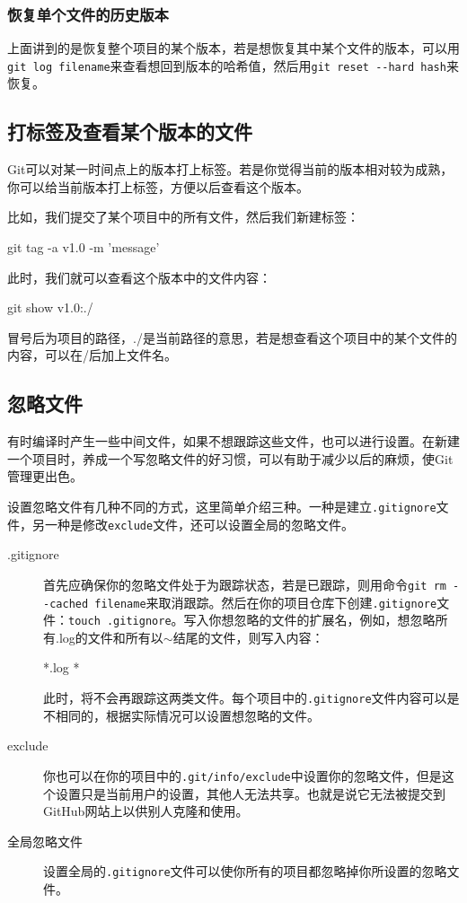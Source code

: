\documentclass[a4paper,12pt]{article}
\begin{document}
\subsubsection{恢复单个文件的历史版本}

上面讲到的是恢复整个项目的某个版本，若是想恢复其中某个文件的版本，可以用\lstinline|git log filename|来查看想回到版本的哈希值，然后用\lstinline|git reset --hard hash|来恢复。

\subsection{打标签及查看某个版本的文件}
Git可以对某一时间点上的版本打上标签。若是你觉得当前的版本相对较为成熟，你可以给当前版本打上标签，方便以后查看这个版本。

比如，我们提交了某个项目中的所有文件，然后我们新建标签：
\begin{bash}
git tag -a v1.0 -m 'message'
\end{bash}
此时，我们就可以查看这个版本中的文件内容：
\begin{bash}
git show v1.0:./
\end{bash}
冒号后为项目的路径，./是当前路径的意思，若是想查看这个项目中的某个文件的内容，可以在/后加上文件名。
\subsection{忽略文件}

有时编译时产生一些中间文件，如果不想跟踪这些文件，也可以进行设置\cite{5:misc}。在新建一个项目时，养成一个写忽略文件的好习惯，可以有助于减少以后的麻烦，使Git管理更出色。

设置忽略文件有几种不同的方式，这里简单介绍三种。一种是建立\verb|.gitignore|文件，另一种是修改\verb|exclude|文件，还可以设置全局的忽略文件。
\begin{description}
\item[.gitignore] 首先应确保你的忽略文件处于为跟踪状态，若是已跟踪，则用命令\lstinline|git rm --cached filename|来取消跟踪。然后在你的项目仓库下创建\verb|.gitignore|文件：\lstinline|touch .gitignore|。写入你想忽略的文件的扩展名，例如，想忽略所有.log的文件和所有以$\sim$结尾的文件，则写入内容：
\begin{plaintext}
*.log
*~
\end{plaintext}

此时，将不会再跟踪这两类文件。每个项目中的\verb|.gitignore|文件内容可以是不相同的，根据实际情况可以设置想忽略的文件。
\item[exclude] 你也可以在你的项目中的\verb|.git/info/exclude|中设置你的忽略文件，但是这个设置只是当前用户的设置，其他人无法共享。也就是说它无法被提交到GitHub网站上以供别人克隆和使用。
\item[全局忽略文件] 设置全局的\verb|.gitignore|文件可以使你所有的项目都忽略掉你所设置的忽略文件。
\end{description}
\end{document}
